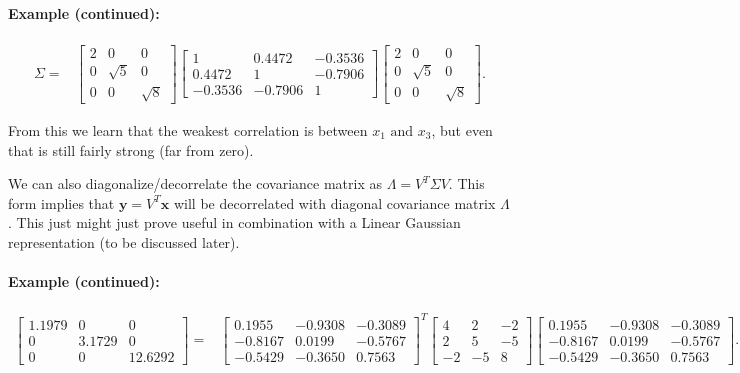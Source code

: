\paragraph{Example (continued):}

\begin{align*}
\Sigma= & \left[\begin{array}{rrr}
2 & 0 & 0\\
0 & \sqrt{5} & 0\\
0 & 0 & \sqrt{8}
\end{array}\right]\left[\begin{array}{ccc}
1 & 0.4472 & -0.3536\\
0.4472 & 1 & -0.7906\\
-0.3536 & -0.7906 & 1
\end{array}\right]\left[\begin{array}{rrr}
2 & 0 & 0\\
0 & \sqrt{5} & 0\\
0 & 0 & \sqrt{8}
\end{array}\right].
\end{align*}


From this we learn that the weakest correlation is between $x_{1}\mbox{ and }x_{3}$,
but even that is still fairly strong (far from zero).

We can also diagonalize/decorrelate the covariance matrix as $\Lambda=V^{T}\Sigma V$.
This form implies that $\mathbf{y}=V^{T}\mathbf{x}$ will be decorrelated
with diagonal covariance matrix $\Lambda$. This just might just prove
useful in combination with a Linear Gaussian representation (to be
discussed later).


\paragraph{Example (continued):\protect \\
}

\begin{align*}
\left[\begin{array}{ccc}
1.1979 & 0 & 0\\
0 & 3.1729 & 0\\
0 & 0 & 12.6292
\end{array}\right]= & \left[\begin{array}{rrr}
0.1955 & -0.9308 & -0.3089\\
-0.8167 & 0.0199 & -0.5767\\
-0.5429 & -0.3650 & 0.7563
\end{array}\right]^{T}\left[\begin{array}{rrr}
4 & 2 & -2\\
2 & 5 & -5\\
-2 & -5 & 8
\end{array}\right]\left[\begin{array}{rrr}
0.1955 & -0.9308 & -0.3089\\
-0.8167 & 0.0199 & -0.5767\\
-0.5429 & -0.3650 & 0.7563
\end{array}\right].
\end{align*}



